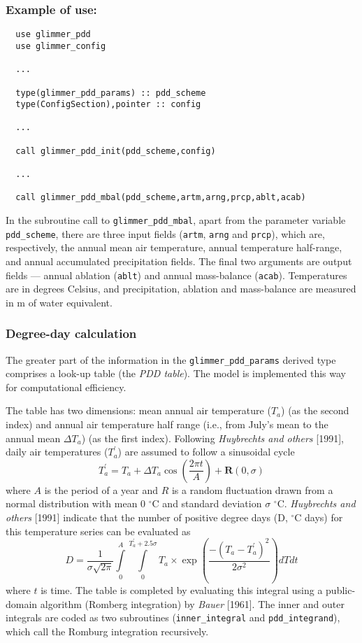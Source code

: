 \subsubsection{Example of use:}
\begin{verbatim}
  use glimmer_pdd
  use glimmer_config

  ...

  type(glimmer_pdd_params) :: pdd_scheme
  type(ConfigSection),pointer :: config

  ...

  call glimmer_pdd_init(pdd_scheme,config)

  ...

  call glimmer_pdd_mbal(pdd_scheme,artm,arng,prcp,ablt,acab)
\end{verbatim}
In the subroutine call to \texttt{glimmer\_pdd\_mbal}, apart from the
parameter variable \texttt{pdd\_scheme}, there are three input fields
(\texttt{artm}, \texttt{arng} and \texttt{prcp}), which are, respectively, the
annual mean air temperature, annual temperature half-range, and annual
accumulated precipitation fields. The final two arguments are output fields
--- annual ablation (\texttt{ablt}) and annual mass-balance
(\texttt{acab}). 
Temperatures are in degrees Celsius, and precipitation, ablation and mass-balance are measured in
m of water equivalent.
%

\subsubsection{Degree-day calculation}
%
The greater part of the information in the \texttt{glimmer\_pdd\_params}
derived type comprises a look-up table (the \emph{PDD table}). The model is
implemented this way for computational efficiency.

The table has two dimensions: mean annual air temperature ($T_a$)
(as the second index) and annual air temperature half range (i.e.,
from July's mean to the annual mean $\Delta T_a$) (as the first
index).  Following \emph{Huybrechts and others} [1991], daily air
temperatures ($T_a^\prime$) are assumed to follow a sinusoidal
cycle
\begin{equation}
    T_a^\prime = T_a + \Delta T_a \cos \left( \frac{2 \pi t}{A}
    \right) + \textbf{R}(0,\sigma)
\end{equation}
where $A$ is the period of a year and $R$ is a random fluctuation
drawn from a normal distribution with mean 0 $^\circ$C and
standard deviation $\sigma$ $^\circ$C. \emph{Huybrechts and
others} [1991] indicate that the number of positive degree days
(D, $^\circ$C days) for this temperature series can be evaluated
as
\begin{equation}\label{pdd}
    D = \frac{1}{\sigma \sqrt{2 \pi}}
    \int\limits_0^A
    \int\limits_0^{T_a^\prime+2.5\sigma}
    T_a \times \exp \left( \frac{-(T_a-T_a^\prime)^2}{2 \sigma^2} \right) dT
    dt
\end{equation}
where $t$ is time.  The table is completed by evaluating this integral using a
public-domain algorithm (Romberg integration) by {\it Bauer} [1961]. The
inner and outer integrals are coded as two subroutines
(\texttt{inner\_integral} and \texttt{pdd\_integrand}), which call the Romburg
integration recursively.

